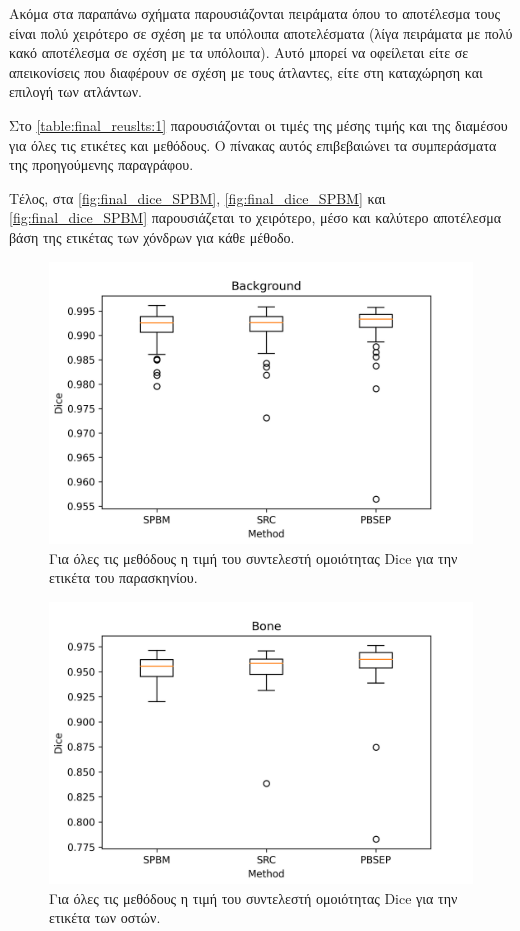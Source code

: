 \documentclass[a4paper,12pt]{article}
\begin{document}
Ακόμα στα παραπάνω σχήματα παρουσιάζονται πειράματα όπου το αποτέλεσμα τους
είναι πολύ χειρότερο σε σχέση με τα υπόλοιπα αποτελέσματα (λίγα πειράματα με
πολύ κακό αποτέλεσμα σε σχέση με τα υπόλοιπα). Αυτό μπορεί να οφείλεται είτε σε
απεικονίσεις που διαφέρουν σε σχέση με τους άτλαντες, είτε στη καταχώρηση και
επιλογή των ατλάντων.

Στο \autoref{table:final_reuslts:1} παρουσιάζονται οι τιμές της μέσης τιμής και
της διαμέσου για όλες τις ετικέτες και μεθόδους. Ο πίνακας αυτός επιβεβαιώνει τα
συμπεράσματα της προηγούμενης παραγράφου.

Τέλος, στα \autoref{fig:final_dice_SPBM}, \autoref{fig:final_dice_SPBM}
και \autoref{fig:final_dice_SPBM} παρουσιάζεται το χειρότερο, μέσο και καλύτερο
αποτέλεσμα βάση της ετικέτας των χόνδρων για κάθε μέθοδο.


\begin{figure}[H]
    \centering
    \includegraphics[width=0.85\linewidth]{Dice_final_Background_plot.png}
    \caption{Για όλες τις μεθόδους η τιμή του συντελεστή ομοιότητας Dice για την
             ετικέτα του παρασκηνίου.}
    \label{fig:dice_final:1}
\end{figure}

\begin{figure}[H]
    \centering
    \includegraphics[width=0.85\linewidth]{Dice_final_Bone_plot.png}
    \caption{Για όλες τις μεθόδους η τιμή του συντελεστή ομοιότητας Dice για την
             ετικέτα των οστών.}
    \label{fig:dice_final:2}
\end{figure}
\end{document}
